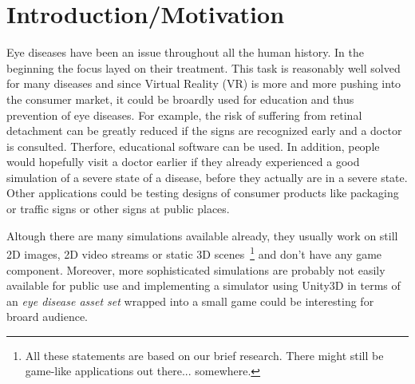 \documentclass{acm_proc_article-sp}
\begin{document}
%

%
%
% 

\section{Introduction/Motivation}
Eye diseases have been an issue throughout all the human history. In the
beginning the focus layed on their treatment. This task is reasonably well
solved for many diseases and since Virtual Reality (VR) is more and more
pushing into the consumer market, it could be broardly used for education and
thus prevention of eye diseases. For example, the risk of suffering from
retinal detachment can be greatly reduced if the signs are recognized early
and a doctor is consulted. Therfore, educational software can be used.
In addition, people would hopefully visit a doctor earlier if they already
experienced a good simulation of a severe state of a disease, before they
actually are in a severe state.
Other applications could be testing designs of consumer products like packaging
or traffic signs or other signs at public places.

Altough there are many simulations available already, they usually work on
still 2D images, 2D video streams or static 3D scenes \footnote{All these
statements are based on our brief research. There might still be game-like
applications out there... somewhere.} and don't have any game component.
Moreover, more sophisticated simulations are probably not easily available
for public use and implementing a simulator using Unity3D in terms of an
\emph{eye disease asset set} wrapped into a small game could be interesting
for broard audience.

\end{document}
